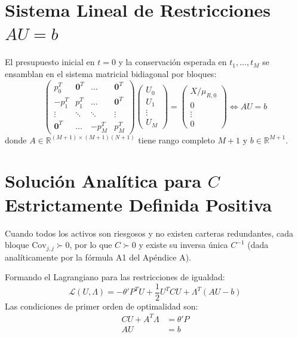 \documentclass[11pt,a4paper]{report}
\numberwithin{equation}{chapter}
\begin{document}
\section{Sistema Lineal de Restricciones $AU = b$}

El presupuesto inicial en $t=0$ y la conservación esperada en $t_1, \dots, t_M$ se ensamblan en el sistema matricial bidiagonal por bloques:
\begin{equation}
    \begin{pmatrix}
        p_0^T  & \mathbf{0}^T & \dots & \mathbf{0}^T \\
        -p_1^T & p_1^T        & \dots & \mathbf{0}^T \\
        \vdots & \ddots       & \ddots & \vdots \\
        \mathbf{0}^T & \dots  & -p_M^T & p_M^T
    \end{pmatrix}
    \begin{pmatrix} U_0 \\ U_1 \\ \vdots \\ U_M \end{pmatrix} =
    \begin{pmatrix} X/\mu_{R,0} \\ 0 \\ \vdots \\ 0 \end{pmatrix} \iff \boxed{AU = b}
\end{equation}
donde $A \in \mathbb{R}^{(M+1) \times (M+1)(N+1)}$ tiene rango completo $M+1$ y $b \in \mathbb{R}^{M+1}$.

\section{Solución Analítica para $C$ Estrictamente Definida Positiva}

Cuando todos los activos son riesgosos y no existen carteras redundantes, cada bloque $\mathrm{Cov}_{j,j} \succ 0$, por lo que $C \succ 0$ y existe su inversa única $C^{-1}$ (dada analíticamente por la fórmula A1 del Apéndice A).

Formando el Lagrangiano para las restricciones de igualdad:
\begin{equation}
    \mathcal{L}(U, \Lambda) = -\theta' P^T U + \frac{1}{2} U^T C U + \Lambda^T (AU - b)
\end{equation}
Las condiciones de primer orden de optimalidad son:
\begin{align}
    CU + A^T \Lambda &= \theta' P \label{eq:FOC_QP_1} \\
    AU &= b \label{eq:FOC_QP_2}
\end{align}
\end{document}
